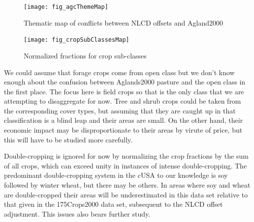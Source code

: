 \begin{figure}[hpt] 
  \begin{center} 


    \texttt{[image: fig\_agcThemeMap]}
  \end{center} 
  \caption{Thematic map of conflicts between NLCD offsets and Agland2000}
  \label{fig:agcThemeMap} 
\end{figure} 



\begin{figure}[hpt] 
  \begin{center} 


    \texttt{[image: fig\_cropSubClassesMap]}
  \end{center} 
  \caption{Normalized fractions for crop sub-classes}
  \label{fig:cropSubClassesMap} 
\end{figure} 


We could assume that forage crops come from open class but we don't
know enough about the confusion between Aglands2000 pasture and the
open class in the first place.  The focus here is field crops so that
is the only class that we are attempting to disaggregate for now.
Tree and shrub crops could be taken from the corresponding cover
types, but assuming that they are caught up in that classification is
a blind leap and their areas are small.  On the other hand, their
economic impact may be disproportionate to their areas by virute of
price, but this will have to be studied more carefully.

Double-cropping is ignored for now by normalizing the crop fractions
by the sum of all crops, which can exceed unity in instances of
intense double-cropping.  The predominant double-cropping system in
the cUSA to our knowledge is soy followed by winter wheat, but there
may be others.  In areas where soy and wheat are double-cropped their
areas will be underestimated in this data set relative to that given
in the 175Crops2000 data set, subsequent to the NLCD offset
adjustment.  This issues also bears further study.




